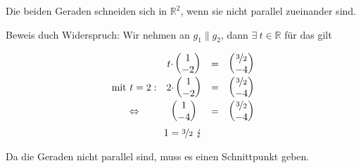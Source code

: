 \documentclass[main.tex]{subfiles}
\begin{document}
Die beiden Geraden schneiden sich in $\displaystyle \mathbb{R}^{2}$, wenn sie nicht parallel zueinander sind.

Beweis duch Widerspruch: Wir nehmen an $\displaystyle g_{1} \parallel g_{2}$, dann $\displaystyle \exists \ t\in \mathbb{R}$ für das gilt

\begin{gather*}
    \begin{array}{ c c c c }
        & t\cdotp \begin{pmatrix}
        1\\
        -2
        \end{pmatrix} & = & \begin{pmatrix}
        \nicefrac{3}{2}\\
        -4
        \end{pmatrix}\\
        \text{mit} \ t=2: & 2\cdotp \begin{pmatrix}
        1\\
        -2
        \end{pmatrix} & = & \begin{pmatrix}
        \nicefrac{3}{2}\\
        -4
        \end{pmatrix}\\
        \Leftrightarrow  & \begin{pmatrix}
        1\\
        -4
        \end{pmatrix} & = & \begin{pmatrix}
        \nicefrac{3}{2}\\
        -4
        \end{pmatrix}
    \end{array}\\
    1=\nicefrac{3}{2} \ \lightning
\end{gather*}

Da die Geraden nicht parallel sind, muss es einen Schnittpunkt geben.
\end{document}
